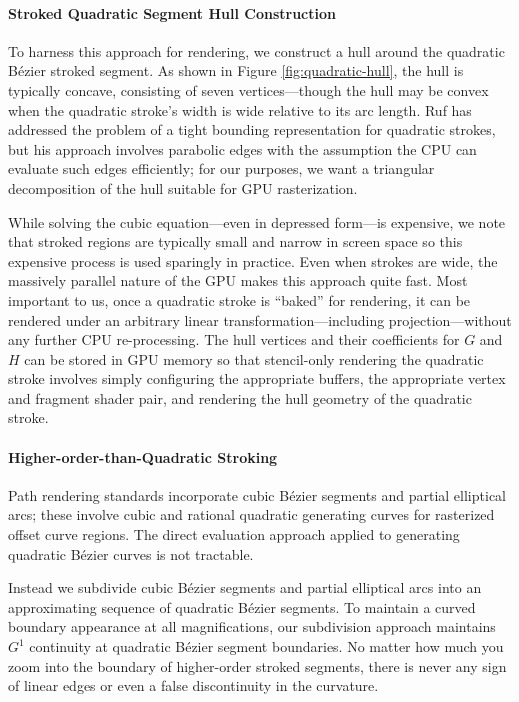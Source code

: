 \paragraph{Stroked Quadratic Segment Hull Construction}

To harness this approach for rendering, we construct a hull
around the quadratic B\'{e}zier stroked segment.  As shown in
Figure \ref{fig:quadratic-hull}, the hull is typically concave,
consisting of seven vertices---though the hull may be convex when
the quadratic stroke's width is wide relative to its arc length.
Ruf  has addressed the problem of a
tight bounding representation for quadratic strokes, but his approach
involves parabolic edges with the assumption the CPU can evaluate such
edges efficiently; for our purposes, we want a triangular decomposition
of the hull suitable for GPU rasterization.

While solving the cubic equation---even in depressed form---is expensive,
we note that stroked regions are typically small and narrow in screen
space so this expensive process is used sparingly in practice.  Even when
strokes are wide, the massively parallel nature of the GPU makes this
approach quite fast.  Most important to us, once a quadratic stroke
is ``baked'' for rendering, it can be rendered under an arbitrary
linear transformation---including projection---without any further
CPU re-processing.  The hull vertices and their coefficients for $G$
and $H$ can be stored in GPU memory so that stencil-only rendering the
quadratic stroke involves simply configuring the appropriate buffers,
the appropriate vertex and fragment shader pair, and rendering the
hull geometry of the quadratic stroke.

\paragraph{Higher-order-than-Quadratic Stroking}

Path rendering standards incorporate cubic B\'{e}zier segments and
partial elliptical arcs; these involve cubic and rational quadratic
generating curves for rasterized offset curve regions.  The direct
evaluation approach applied to generating quadratic B\'{e}zier curves
is not tractable.

Instead we subdivide cubic B\'{e}zier segments and partial elliptical
arcs into an approximating sequence of quadratic B\'{e}zier segments.
To maintain a curved boundary appearance at all magnifications, our
subdivision approach maintains $G^1$ continuity at quadratic B\'{e}zier
segment boundaries.  No matter how much you zoom into the boundary of
higher-order stroked segments, there is never any sign of linear edges
or even a false discontinuity in the curvature.

